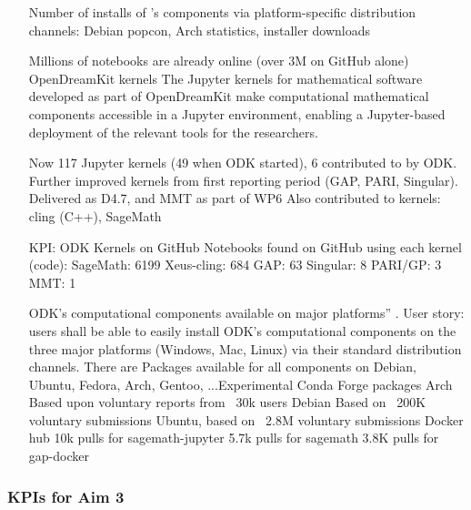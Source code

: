 \begin{enumerate}
\item [Number of installs of \ODK's components via platform-specific distribution channels: Debian popcon, Arch statistics, installer
  downloads]



Millions of notebooks are already online (over 3M on GitHub alone)
OpenDreamKit kernels
The Jupyter kernels for mathematical software  developed as part of OpenDreamKit make computational mathematical components accessible in a 
Jupyter environment, enabling a Jupyter-based deployment of the relevant tools for the researchers.

Now 117 Jupyter kernels (49 when ODK started), 6 contributed to by ODK.
Further improved kernels from first reporting period (GAP, PARI, Singular). 
Delivered as D4.7, and MMT as part of WP6
Also contributed to kernels: cling (C++), SageMath

KPI: ODK Kernels on GitHub
Notebooks found on GitHub using each kernel (code):
SageMath: 6199
Xeus-cling: 684
GAP: 63
Singular: 8
PARI/GP: 3
MMT: 1

ODK’s computational components available on major platforms” .
User story: users shall be able to easily install ODK’s computational components on the three major platforms (Windows, Mac, Linux)
via their standard distribution channels.
There are Packages available for all components on Debian, Ubuntu, Fedora, Arch, Gentoo, ...Experimental Conda Forge packages  
Arch Based upon voluntary reports from ~30k users 
Debian Based on ~200K voluntary submissions 
Ubuntu, based on ~2.8M voluntary submissions 
Docker hub 
10k pulls for sagemath-jupyter
5.7k pulls for sagemath
3.8K pulls for gap-docker

 \end{enumerate}     
 
\subsubsection{KPIs for Aim 3}

